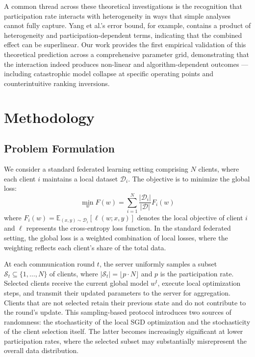 \documentclass[conference]{IEEEtran}
\begin{document}
A common thread across these theoretical investigations is the recognition that participation rate interacts with heterogeneity in ways that simple analyses cannot fully capture. Yang et al.'s error bound, for example, contains a product of heterogeneity and participation-dependent terms, indicating that the combined effect can be superlinear. Our work provides the first empirical validation of this theoretical prediction across a comprehensive parameter grid, demonstrating that the interaction indeed produces non-linear and algorithm-dependent outcomes --- including catastrophic model collapse at specific operating points and counterintuitive ranking inversions.


\section{Methodology}

\subsection{Problem Formulation}

We consider a standard federated learning setting comprising $N$ clients, where each client $i$ maintains a local dataset $\mathcal{D}_i$. The objective is to minimize the global loss:
\begin{equation}
    \min_w F(w) = \sum_{i=1}^{N} \frac{|\mathcal{D}_i|}{|\mathcal{D}|} F_i(w)
\end{equation}
where $F_i(w) = \mathbb{E}_{(x,y) \sim \mathcal{D}_i}[\ell(w; x, y)]$ denotes the local objective of client $i$ and $\ell$ represents the cross-entropy loss function. In the standard federated setting, the global loss is a weighted combination of local losses, where the weighting reflects each client's share of the total data.

At each communication round $t$, the server uniformly samples a subset $\mathcal{S}_t \subseteq \{1, \ldots, N\}$ of clients, where $|\mathcal{S}_t| = \lfloor p \cdot N \rfloor$ and $p$ is the participation rate. Selected clients receive the current global model $w^t$, execute local optimization steps, and transmit their updated parameters to the server for aggregation. Clients that are not selected retain their previous state and do not contribute to the round's update. This sampling-based protocol introduces two sources of randomness: the stochasticity of the local SGD optimization and the stochasticity of the client selection itself. The latter becomes increasingly significant at lower participation rates, where the selected subset may substantially misrepresent the overall data distribution.
\end{document}
